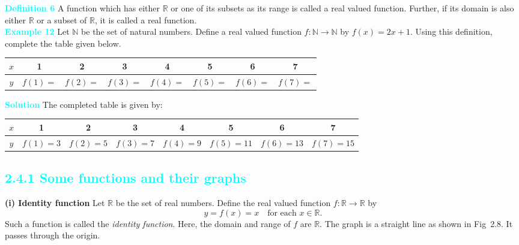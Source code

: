 \documentclass[11pt]{article}
\begin{document}
\vspace{0.45cm}
\colorbox{ncertblue}{\textcolor{cyan}{\textbf{Definition 6}}}\hspace{0.5em} A function which has either $\mathbb{R}$ or one of its subsets as its range is called a real valued function. Further, if its domain is also either $\mathbb{R}$ or a subset of $\mathbb{R}$, it is called a real function.\\
 \textcolor{cyan}{\textbf{Example 12}} 
Let $\mathbb{N}$ be the set of natural numbers. Define a real valued function
$f : \mathbb{N} \to \mathbb{N}$ by $f(x) = 2x + 1$. Using this definition,
complete the table given below.

\medskip
\begin{center}
    \renewcommand{\arraystretch}{1.4}
\begin{tabular}{|c|c|c|c|c|c|c|c|}
\hline
\rowcolor{ncertblue}
$x$ & 1 & 2 & 3 & 4 & 5 & 6 & 7 \\ \hline
\rowcolor{ncertblue}
$y$ & $f(1)=$ & $f(2)=$ & $f(3)=$ & $f(4)=$ & $f(5)=$ & $f(6)=$ & $f(7)=$ \\ \hline
\end{tabular}
\end{center}
\vspace{15pt}
\noindent \textcolor{cyan}{\textbf{Solution}} The completed table is given by:
\medskip
\begin{center}
    \renewcommand{\arraystretch}{1.4}
\begin{tabular}{|c|c|c|c|c|c|c|c|}
\hline
\rowcolor{ncertblue}
$x$ & 1 & 2 & 3 & 4 & 5 & 6 & 7 \\ \hline
\rowcolor{ncertblue}
$y$ & $f(1)=3$ & $f(2)=5$ & $f(3)=7$ & $f(4)=9$ & $f(5)=11$ & $f(6)=13$ & $f(7)=15$ \\ \hline
\end{tabular}
\end{center}
\textcolor{cyan}{\subsection*{2.4.1 Some functions and their graphs}}
\medskip

\noindent\textbf{(i) Identity function}  
Let $\mathbb{R}$ be the set of real numbers. Define the real valued function  
$f : \mathbb{R} \to \mathbb{R}$ by
\[
y = f(x) = x \quad \text{for each } x \in \mathbb{R}.
\]
Such a function is called the \emph{identity function}. Here, the domain and
range of $f$ are $\mathbb{R}$. The graph is a straight line as shown in Fig~2.8.
It passes through the origin.
\end{document}
